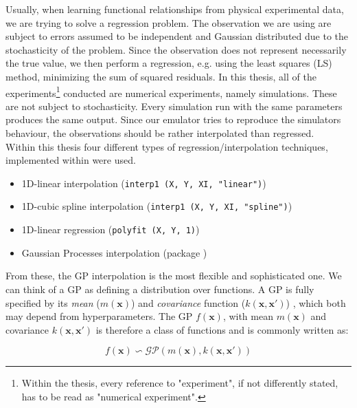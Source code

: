 Usually, when learning functional relationships from physical experimental data, we are trying to solve a regression problem.
The observation we are using are subject to errors assumed to be independent and Gaussian distributed due to the stochasticity of the problem.
Since the observation does not represent necessarily the true value, we then perform a regression, e.g. using the least squares (LS) method, minimizing the sum of squared residuals.
In this thesis, all of the experiments\footnote{Within the thesis, every reference to "experiment", if not differently stated, has to be read as "numerical experiment".} conducted are numerical experiments, namely simulations.
These are not subject to stochasticity.
Every simulation run with the same parameters produces the same output.
Since our emulator tries to reproduce the simulators behaviour, the observations should be rather interpolated than regressed.\\

Within this thesis four different types of regression/interpolation techniques, implemented within  were used.

\begin{itemize}
\itemsep0em
  \item 1D-linear interpolation (\texttt{interp1 (X, Y, XI, "linear")})
  \item 1D-cubic spline interpolation (\texttt{interp1 (X, Y, XI, "spline")})
  \item 1D-linear regression (\texttt{polyfit (X, Y, 1)})
  \item Gaussian Processes interpolation (package )
\end{itemize}

From these, the GP interpolation is the most flexible and sophisticated one.
We can think of a GP as defining a distribution over functions.
A GP is fully specified by its \emph{mean} ($m(\bm{x})$) and \emph{covariance} function ($k(\bm{x},\bm{x}')$) \autocite{rasmussen_gaussian_2006}, which both may depend from hyperparameters.
The GP $f(\bm{x})$, with mean $m(\bm{x})$ and covariance $k(\bm{x},\bm{x}')$ is therefore a class of functions and is commonly written as:

\begin{equation}
  f(\bm{x}) \backsim \mathcal{GP}\left(m(\bm{x}), k(\bm{x},\bm{x}')\right)
\end{equation}

